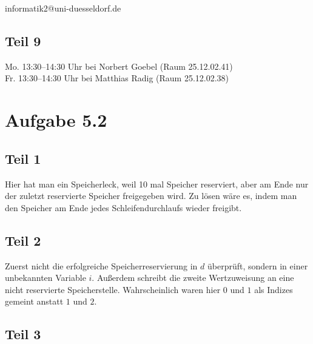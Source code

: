 \documentclass[10pt,a4paper]{article}
\begin{document}
informatik2@uni-duesseldorf.de

\subsection*{Teil 9}

Mo.	13:30–14:30 Uhr		bei Norbert Goebel	 (Raum 25.12.02.41)\\
Fr.	13:30–14:30 Uhr		bei Matthias Radig	 (Raum 25.12.02.38)

\section*{Aufgabe 5.2}

\subsection*{Teil 1}

Hier hat man ein Speicherleck, weil 10 mal Speicher reserviert, aber am Ende nur der zuletzt reservierte Speicher freigegeben wird.
Zu lösen wäre es, indem man den Speicher am Ende jedes Schleifendurchlaufs wieder freigibt.

\subsection*{Teil 2}

Zuerst nicht die erfolgreiche Speicherreservierung in $d$ überprüft, sondern in einer unbekannten Variable $i$.
Außerdem schreibt die zweite Wertzuweisung an eine nicht reservierte Speicherstelle.
Wahrscheinlich waren hier $0$ und $1$ als Indizes gemeint anstatt $1$ und $2$.

\subsection*{Teil 3}
\end{document}
